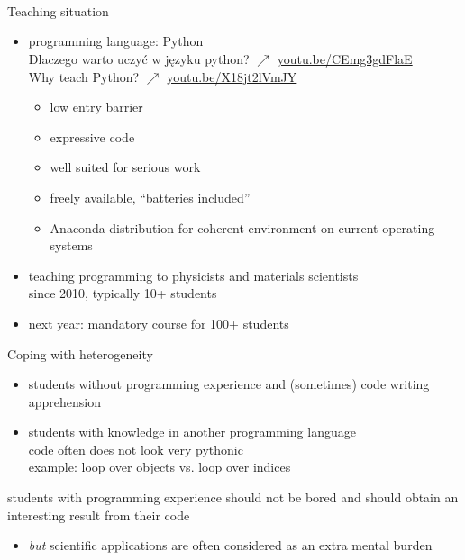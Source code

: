 \documentclass[svgnames]{beamer}
\newcommand\but{\alert{\textit{but}} }
\begin{document}
\begin{frame}[t]
 \vspace{1.5truecm}
 \begin{center}
  \\[0.2truecm]
  \\[0.8truecm]
  \\[0.1truecm]
 \end{center}
\end{frame}

\begin{frame}{Teaching situation}
 \begin{itemize}
  \item programming language: Python\\
	{\small Dlaczego warto uczyć w języku python? {\scriptsize$\nearrow$} \url{youtu.be/CEmg3gdFlaE}}\\
	{\small Why teach Python? {\scriptsize$\nearrow$} \url{youtu.be/X18jt2lVmJY}}
        \begin{itemize}
	 \item low entry barrier
	 \item expressive code
	 \item well suited for serious work
	 \item freely available, ``batteries included''
         \item Anaconda distribution for coherent environment on
	       current operating systems
	\end{itemize}
  \item teaching programming to physicists and materials scientists\\
	since 2010, typically 10+ students
  \item next year: mandatory course for 100+ students
 \end{itemize}

\end{frame}

\begin{frame}{Coping with heterogeneity}
 \begin{itemize}
  \item students without programming experience and (sometimes) code writing apprehension
  \item students with knowledge in another programming language\\
	code often does not look very pythonic\\
	example: loop over objects vs. loop over indices
 \end{itemize}

 students with programming experience should not be bored and should obtain an interesting
 result from their code

 \begin{itemize}
  \item \but scientific applications are often considered as an extra mental burden
 \end{itemize}
\end{frame}
\end{document}
